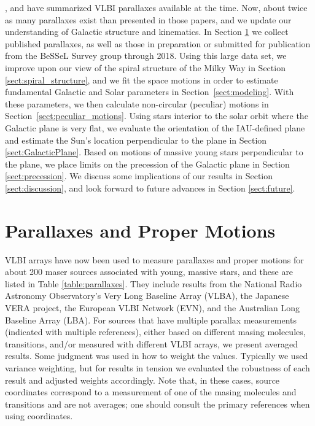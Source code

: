 \documentclass[12pt,preprint]{aastex}
\begin{document}
\citet{Reid:09b}, \citet{Honma:12} and \citet{Reid:14} have summarized
VLBI parallaxes available at the time.  Now, about twice as many parallaxes exist 
than presented in those papers, and we update our understanding of
Galactic structure and kinematics.
In Section \ref{sect:parallaxes} we collect published parallaxes,  
as well as those in preparation or submitted for publication from the BeSSeL
Survey group through 2018.  Using this large data set, we improve upon our view 
of the spiral structure of the Milky Way in Section \ref{sect:spiral_structure}, 
and we fit the space motions in order to estimate fundamental Galactic and Solar 
parameters in Section~\ref{sect:modeling}.  With these parameters, we then
calculate non-circular (peculiar) motions in Section~\ref{sect:peculiar_motions}. 
Using stars interior to the solar
orbit where the Galactic plane is very flat, we evaluate the orientation of the 
IAU-defined plane and estimate the Sun's location perpendicular to the plane in 
Section \ref{sect:GalacticPlane}.  Based on motions of massive young stars perpendicular 
to the plane, we place limits on the precession of the Galactic plane in Section 
\ref{sect:precession}.  We discuss some implications of our results in 
Section \ref{sect:discussion}, and look forward to future advances in Section 
\ref{sect:future}.
 

\section{Parallaxes and Proper Motions} \label{sect:parallaxes}

VLBI arrays have now been used to measure parallaxes and proper motions for about
200 maser sources associated with young, massive stars, and these are listed in  
Table \ref{table:parallaxes}.  They include results from 
the National Radio Astronomy Observatory's Very Long Baseline Array (VLBA), 
the Japanese VERA project, the European VLBI Network (EVN), and the Australian
Long Baseline Array (LBA).  For sources that have multiple parallax 
measurements (indicated with multiple references), either based on different 
masing molecules, transitions, and/or measured with different 
VLBI arrays, we present averaged results.  Some judgment was used in how to
weight the values.  Typically we used variance weighting, but for results
in tension we evaluated the robustness of each result and adjusted weights 
accordingly.  Note that, in these cases, source coordinates correspond to
a measurement of one of the masing molecules and transitions and are not averages;  
one should consult the primary references when using coordinates. 
\end{document}
